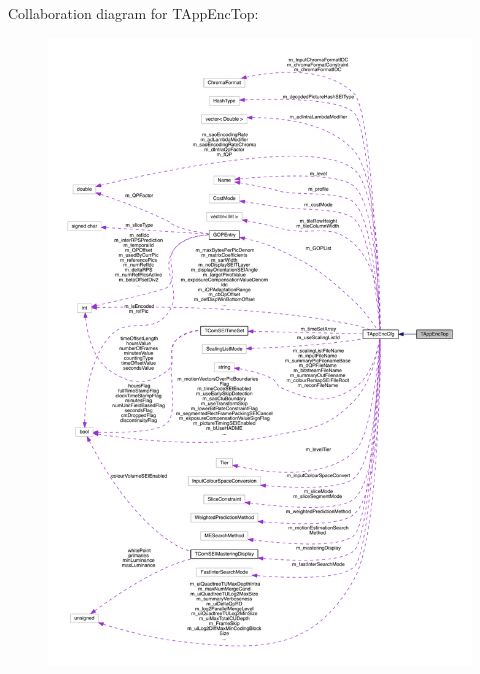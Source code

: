 Collaboration diagram for T\+App\+Enc\+Top\+:
\nopagebreak
\begin{figure}[H]
\begin{center}
\leavevmode
\includegraphics[width=350pt]{d4/da9/class_t_app_enc_top__coll__graph}
\end{center}
\end{figure}
